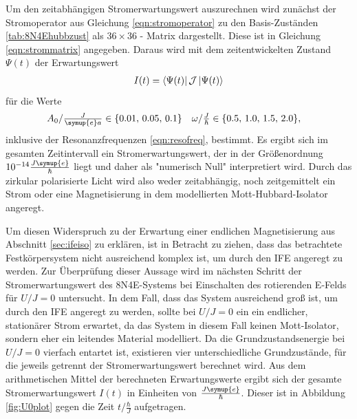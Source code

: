 Um den zeitabhängigen Stromerwartungswert auszurechnen wird zunächst der Stromoperator aus Gleichung \eqref{eqn:stromoperator} zu
den Basis-Zuständen \ref{tab:8N4Ehubbzust} als $36 \times 36$ - Matrix dargestellt. Diese ist in Gleichung \eqref{eqn:strommatrix} angegeben.
Daraus wird mit dem zeitentwickelten Zustand $\Psi(t)$ der Erwartungswert
\begin{align}
  I(t) = \bra{\Psi(t)} \mathcal{J} \ket{\Psi(t)}
\end{align}
für die Werte
\begin{align}
  A_0 /\tfrac{J}{\symup{e}a} & \in \{0.01,\, 0.05,\, 0.1\} & \omega /\tfrac{J}{\hbar} & \in \{0.5,\, 1.0,\, 1.5, \, 2.0\},
\end{align}
inklusive der Resonanzfrequenzen \eqref{eqn:resofreq}, bestimmt.
Es ergibt sich im gesamten Zeitintervall ein Stromerwartungswert,
der in der Größenordnung $10^{-14} \frac{J\symup{e}}{\hbar}$ liegt und daher als "numerisch Null" interpretiert wird.
Durch das zirkular polarisierte Licht wird also weder zeitabhängig, noch zeitgemittelt ein Strom oder eine Magnetisierung in dem
modellierten Mott-Hubbard-Isolator angeregt.

Um diesen Widerspruch zu der Erwartung einer endlichen Magnetisierung aus Abschnitt \ref{sec:ifeiso} zu erklären, ist in Betracht zu ziehen,
dass das betrachtete Festkörpersystem nicht ausreichend komplex ist, um durch den IFE angeregt zu werden.
Zur Überprüfung dieser Aussage wird im nächsten Schritt der Stromerwartungswert des 8N4E-Systems bei Einschalten des rotierenden E-Felds für $U/J = 0$ untersucht.
In dem Fall, dass das System ausreichend groß ist, um durch den IFE angeregt zu werden, sollte bei $U/J = 0$ ein ein endlicher, stationärer Strom erwartet,
da das System in diesem Fall keinen Mott-Isolator, sondern eher ein leitendes Material modelliert.
Da die Grundzustandsenergie bei $U/J = 0$ vierfach entartet ist, existieren vier unterschiedliche Grundzustände, für die jeweils getrennt
der Stromerwartungswert berechnet wird. Aus dem arithmetischen Mittel der berechneten Erwartungswerte ergibt sich der gesamte
Stromerwartungswert $I(t)$ in Einheiten von $\frac{J\symup{e}}{\hbar}$. Dieser ist in Abbildung \ref{fig:U0plot} gegen die Zeit $t/\tfrac{\hbar}{J}$ aufgetragen.

